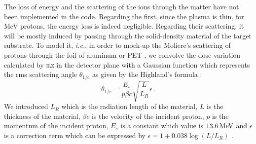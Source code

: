 \documentclass[aps,twocolumn,showpacs,superscriptaddress]{revtex4}
\begin{document}
The loss of energy and the scattering of the ions through the matter have not been implemented in the code. Regarding the first, since the plasma is thin, for MeV protons, the energy loss is indeed negligible. Regarding their scattering, it will be mostly induced by passing through the solid-density material of the target substrate. To model it, \emph{i.e.}, in order to mock-up the Moliere's scattering of protons through the foil of aluminum or PET \cite{Moliere_1947}, we convolve the dose variation calculated by \textsc{ilz} in the detector plane with a Gaussian function which represents the rms scattering angle $\theta_{1/e}$ as given by the Highland’s formula \cite{NIM_Highland_1975}:
\begin{equation}
\theta_{1/e}  = \frac{E_s}{p\beta c} \sqrt{\frac{L}{L_R}} \epsilon  \, .
\end{equation}
We introduced $L_R$ which is the radiation length of the material, $L$ is the thickness of the material, $\beta c$ is the velocity of the incident proton, $p$ is the momentum of the incident proton, $E_s$ is a constant which value is $13.6\,\rm MeV$ and  $\epsilon$ is a correction term which can be expressed by $\epsilon  = 1 + 0.038 \log\left(L/L_R\right)$ \cite{EPJ_Groom_2000}. 
\end{document}
